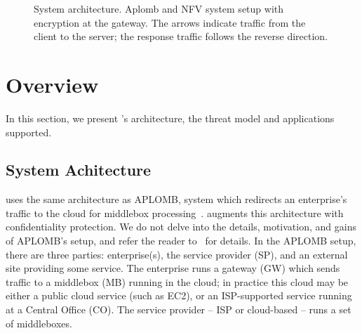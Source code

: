 
\begin{figure}[t!]
\centering
{}
%
\hfill  
{}
     
\caption{System architecture. Aplomb and NFV system setup with \sys encryption  at the gateway. The arrows indicate traffic from the client to the server; the response traffic follows the reverse direction. \label{fig:sys-overview}}
\end{figure}




     
\section{Overview}\label{sec:overview}








In this section, we present \sys's architecture, the threat model and applications supported.


\subsection{System Achitecture}

\sys uses the same  architecture as APLOMB, system which redirects an enterprise's traffic to the cloud for middlebox processing~\cite{aplomb}. \sys augments this architecture with confidentiality protection.
We do not delve into the details, motivation, and gains of APLOMB's setup, and refer the reader to~\cite{aplomb} for details. 
In the APLOMB setup, there are three parties: enterprise(s), the service provider (SP), and an external site providing
some service. The enterprise runs a gateway (GW) which sends traffic to a middlebox (MB) running in the cloud; in practice this cloud may be either a public cloud service (such as EC2), or an ISP-supported service running at a Central Office (CO).
The service provider -- ISP or cloud-based -- runs a set of middleboxes. 


